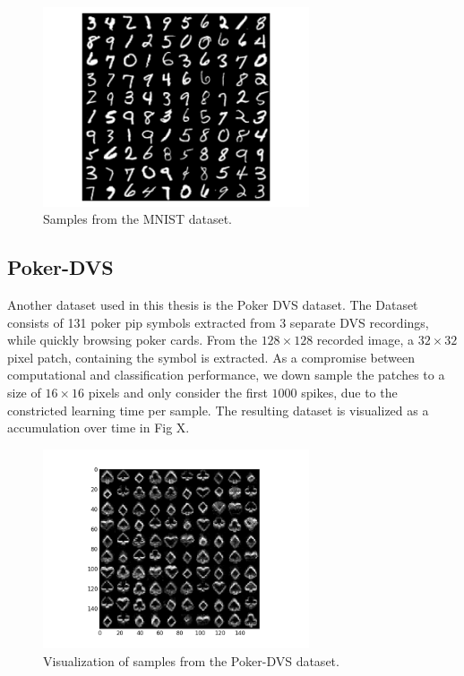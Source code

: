 \begin{figure}[h!]
	\centering
    	\includegraphics[width=0.7\textwidth]{imgs/mnist.png} 
    \caption{Samples from the MNIST dataset.}
	\label{fig:mnist}
\end{figure}


\subsection{Poker-DVS}

Another dataset used in this thesis is the Poker DVS dataset.
The Dataset consists of 131 poker pip symbols extracted from 3 separate DVS recordings, while quickly browsing poker cards.
From the $128 \times 128$ recorded image, a $32 \times 32$ pixel patch, containing the symbol is extracted.
As a compromise between computational and classification performance, we down sample the patches to a size of $16 \times 16$ pixels and only consider the first $1000$ spikes, due to the constricted learning time per sample.
The resulting dataset is visualized as a accumulation over time in Fig X.
 
    
\begin{figure}[h!]
	\centering
    	\includegraphics[width=0.7\textwidth]{imgs/poker_ds.png} 
    \caption{Visualization of samples from the Poker-DVS dataset.}
	\label{fig:mnist}
\end{figure}


